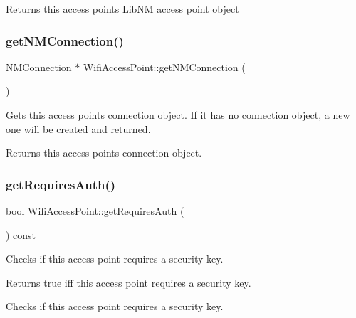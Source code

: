 \begin{DoxyReturn}{Returns}
this access point\textquotesingle{}s Lib\+NM access point object 
\end{DoxyReturn}
\mbox{\label{classWifiAccessPoint_a5d2658efdbbcbf86c3f871b4a2ec5ee6}} 
\subsubsection{\texorpdfstring{get\+N\+M\+Connection()}{getNMConnection()}}
{\footnotesize\ttfamily N\+M\+Connection $\ast$ Wifi\+Access\+Point\+::get\+N\+M\+Connection (\begin{DoxyParamCaption}{ }\end{DoxyParamCaption})}

Gets this access point\textquotesingle{}s connection object. If it has no connection object, a new one will be created and returned.

\begin{DoxyReturn}{Returns}
this access point\textquotesingle{}s connection object. 
\end{DoxyReturn}
\mbox{\label{classWifiAccessPoint_a44a975c477de1605ebda26530f814309}} 
\subsubsection{\texorpdfstring{get\+Requires\+Auth()}{getRequiresAuth()}}
{\footnotesize\ttfamily bool Wifi\+Access\+Point\+::get\+Requires\+Auth (\begin{DoxyParamCaption}{ }\end{DoxyParamCaption}) const}

Checks if this access point requires a security key.

\begin{DoxyReturn}{Returns}
true iff this access point requires a security key.
\end{DoxyReturn}
Checks if this access point requires a security key. \mbox{\label{classWifiAccessPoint_a78e4050d9b8c26aec6b64a778752ffc6}} 
